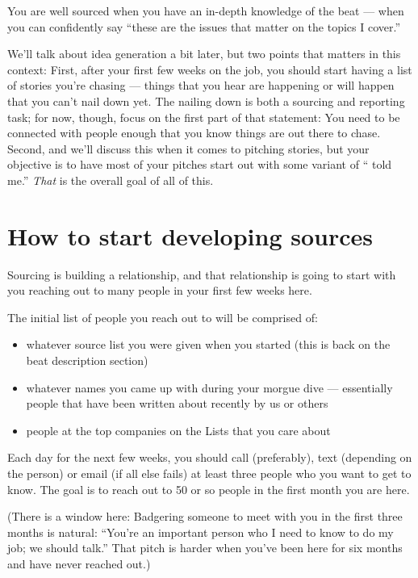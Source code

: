 \documentclass[
  12pt,
  american,
  letterpaperpaper,
  extrafontsizes,onecolumn,openright
  ]{memoir}
\providecommand{\tightlist}{%
  \setlength{\itemsep}{0pt}\setlength{\parskip}{0pt}}
\begin{document}
You are well sourced when you have an in-depth knowledge of the beat --- when you can confidently say \enquote{these are the issues that matter on the topics I cover.}

We'll talk about idea generation a bit later, but two points that matters in this context: First, after your first few weeks on the job, you should start having a list of stories you're chasing --- things that you hear are happening or will happen that you can't nail down yet. The nailing down is both a sourcing and reporting task; for now, though, focus on the first part of that statement: You need to be connected with people enough that you know things are out there to chase. Second, and we'll discuss this when it comes to pitching stories, but your objective is to have most of your pitches start out with some variant of \enquote{ told me.} \emph{That} is the overall goal of all of this.

\hypertarget{how-to-start-developing-sources}{%
\section*{How to start developing sources}\label{how-to-start-developing-sources}}

Sourcing is building a relationship, and that relationship is going to start with you reaching out to many people in your first few weeks here.

The initial list of people you reach out to will be comprised of:

\begin{itemize}
\tightlist
\item
  whatever source list you were given when you started (this is back on the beat description section)
\item
  whatever names you came up with during your morgue dive --- essentially people that have been written about recently by us or others
\item
  people at the top companies on the Lists that you care about
\end{itemize}

Each day for the next few weeks, you should call (preferably), text (depending on the person) or email (if all else fails) at least three people who you want to get to know. The goal is to reach out to 50 or so people in the first month you are here.

(There is a window here: Badgering someone to meet with you in the first three months is natural: \enquote{You're an important person who I need to know to do my job; we should talk.} That pitch is harder when you've been here for six months and have never reached out.)
\end{document}
